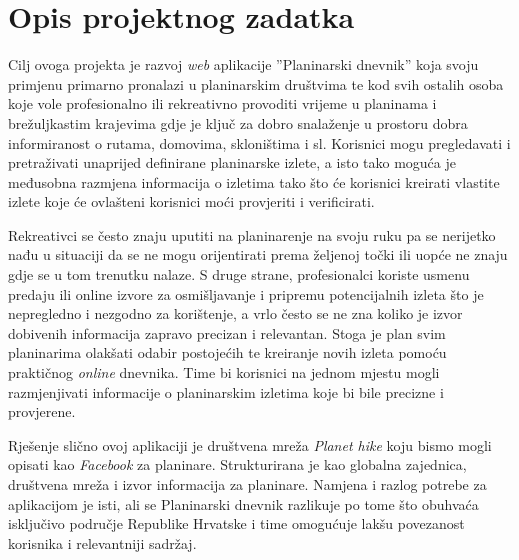 \chapter{Opis projektnog zadatka}

Cilj ovoga projekta je razvoj \emph{web} aplikacije ''Planinarski dnevnik'' koja svoju primjenu primarno pronalazi u planinarskim društvima te kod svih ostalih osoba koje vole profesionalno ili rekreativno provoditi vrijeme u planinama i brežuljkastim krajevima gdje je ključ za dobro snalaženje u prostoru dobra informiranost o rutama, domovima, skloništima i sl. Korisnici mogu pregledavati i pretraživati unaprijed definirane planinarske izlete, a isto tako moguća je međusobna razmjena informacija o izletima tako što će korisnici kreirati vlastite izlete koje će ovlašteni korisnici moći provjeriti i verificirati. \vspace{10pt}

Rekreativci se često znaju uputiti na planinarenje na svoju ruku pa se nerijetko nađu u situaciji da se ne mogu orijentirati prema željenoj točki ili uopće ne znaju gdje se u tom trenutku nalaze. S druge strane, profesionalci koriste usmenu predaju ili online izvore za osmišljavanje i pripremu potencijalnih izleta što je nepregledno i nezgodno za korištenje, a vrlo često se ne zna koliko je izvor dobivenih informacija zapravo precizan i relevantan. Stoga je plan svim planinarima olakšati odabir postojećih te kreiranje novih izleta pomoću praktičnog \emph{online} dnevnika. Time bi korisnici na jednom mjestu mogli razmjenjivati informacije o planinarskim izletima koje bi bile precizne i provjerene. \vspace{10pt}

Rješenje slično ovoj aplikaciji je društvena mreža \emph{Planet hike} koju bismo mogli opisati kao \emph{Facebook} za planinare. Strukturirana je kao  globalna zajednica, društvena mreža i izvor informacija za planinare. Namjena i razlog potrebe za aplikacijom je isti, ali se Planinarski dnevnik razlikuje po tome što obuhvaća isključivo područje Republike Hrvatske i time omogućuje lakšu povezanost korisnika i relevantniji sadržaj. \vspace{10pt}

